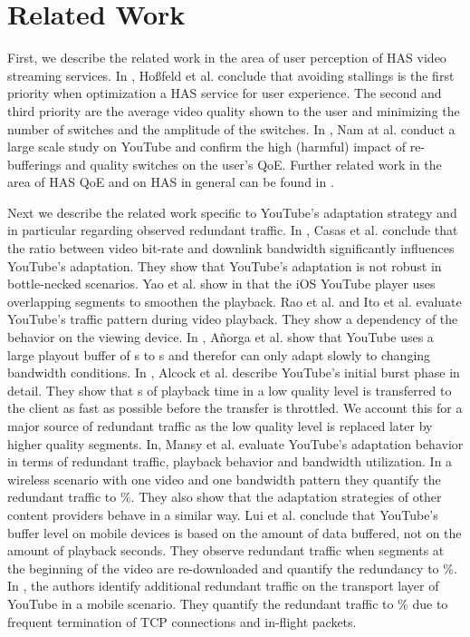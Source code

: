 
\section{Related Work}
\label{sec:relatedwork}

First, we describe the related work in the area of user perception of HAS video streaming services.
In \cite{hossfeld2015identifying, hossfeld14assessingeffect}, Hoßfeld et al. conclude that avoiding stallings is the first priority when optimization a HAS service for user experience. 
The second and third priority are the average video quality shown to the user and minimizing the number of switches and the amplitude of the switches.
In \cite{nam16qoe}, Nam at al. conduct a large scale study on YouTube and confirm the high (harmful) impact of re-bufferings and quality switches on the user's QoE.
Further related work in the area of HAS QoE and on HAS in general can be found in \cite{seufert2015survey}.

Next we describe the related work specific to YouTube's adaptation strategy and in particular regarding observed redundant traffic.
In \cite{casas2012youtube}, Casas et al. conclude that the ratio between video bit-rate and downlink bandwidth significantly influences YouTube's adaptation. 
They show that YouTube's adaptation is not robust in bottle-necked scenarios.
Yao et al. show in \cite{Yao2014b} that the iOS YouTube player uses overlapping segments to smoothen the playback.
Rao et al. \cite{rao2011network} and Ito et al. \cite{ito14networklevel} evaluate YouTube's traffic pattern during video playback. They show a dependency of the behavior on the viewing device.
In \cite{Anorga2015}, A\~norga et al. show that YouTube uses a large playout buffer of \unit[13]{s} to \unit[40]{s} and therefor can only adapt slowly to changing bandwidth conditions.
In \cite{alcock11application}, Alcock et al. describe YouTube's initial burst phase in detail. They show that \unit[32]{s} of playback time in a low quality level is transferred to the client as fast as possible before the transfer is throttled. We account this for a major source of redundant traffic as the low quality level is replaced later by higher quality segments.
In, \cite{Mansy2014} Mansy et al. evaluate YouTube's adaptation behavior in terms of redundant traffic, playback behavior and bandwidth utilization. In a wireless scenario with one video and one bandwidth pattern they quantify the redundant traffic to \unit[16]{\%}. They also show that the adaptation strategies of other content providers behave in a similar way.
Lui et al. \cite{liu2013comparative} conclude that YouTube's buffer level on mobile devices is based on the amount of data buffered, not on the amount of playback seconds. They observe redundant traffic when segments at the beginning of the video are re-downloaded and quantify the redundancy to \unit[15]{\%}.
In \cite{nam2013mobile}, the authors identify additional redundant traffic on the transport layer of YouTube in a mobile scenario. They quantify the redundant traffic to \unit[35]{\%} due to frequent termination of TCP connections and in-flight packets.
